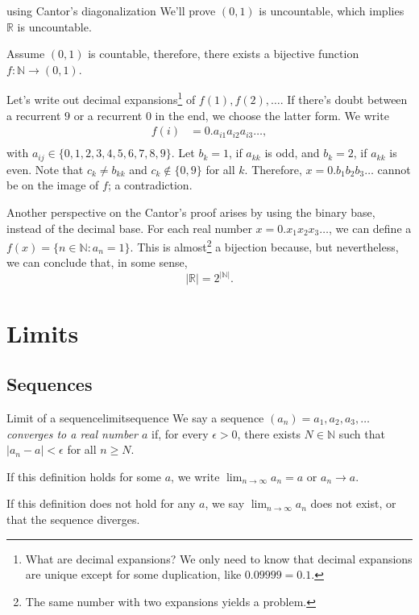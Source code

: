 
\begin{dem}{using Cantor's diagonalization}{}
	We'll prove \((0, 1)\) is uncountable, which implies \(\mathbb{R}\) is uncountable.

	Assume \((0, 1)\) is countable, therefore, there exists a bijective function \(f: \mathbb{N} \to (0, 1)\).

	Let's write out decimal expansions\footnote{What are decimal expansions? We only need to know that decimal expansions are unique except for some duplication, like \(0.09999 = 0.1\).} of \(f(1), f(2), \dots\). If there's doubt between a recurrent \(9\) or a recurrent \(0\) in the end, we choose the latter form. We write
	\begin{align*}
		f(i) &= 0.a_{i1}a_{i2}a_{i3}\dots,\\
	\end{align*}
	with \(a_{ij} \in \{0, 1, 2, 3, 4, 5, 6, 7, 8, 9\}\).
	Let \(b_k = 1\), if \(a_{kk}\) is odd, and \(b_k = 2\), if \(a_{kk}\) is even. Note that \(c_{k} \neq b_{kk}\) and \(c_{k} \notin \{0, 9\}\) for all \(k\).
	Therefore, \(x = 0.b_1b_2b_3\dots\) cannot be on the image of \(f\); a contradiction.
\end{dem}

Another perspective on the Cantor's proof arises by using the binary base, instead of the decimal base. For each real number \(x = 0.x_1x_2x_3\dots\), we can define a \(f(x) = \{n \in \mathbb{N} : a_n = 1\}\). This is almost\footnote{The same number with two expansions yields a problem.} a bijection because, but nevertheless, we can conclude that, in some sense, \[
		|\mathbb{R}| = 2^{|\mathbb{N}|}.
\]

\chapter{Limits}

\section{Sequences}

\begin{defn}{Limit of a sequence}{limitsequence}
	We say a sequence \((a_n) = a_1, a_2, a_3, \dots\) \emph{converges to a real number \(a\)} if, for every \(\epsilon > 0\), there exists \(N \in \mathbb{N}\) such that \(|a_n - a| < \epsilon\) for all \(n \geq N\).

	If this definition holds for some \(a\), we write \(\lim_{n\to\infty} a_n = a\) or \(a_n \to a\).

	If this definition does not hold for any \(a\), we say \(\lim_{n\to\infty} a_n\) does not exist, or that the sequence diverges.
\end{defn}

